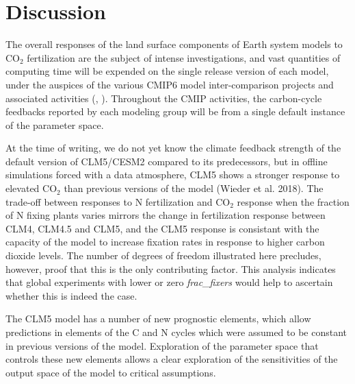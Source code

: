 \usepackage{}\documentclass[draft,linenumbers]{agujournal}
\begin{document}
\section{Discussion}

The overall responses of the land surface components of Earth system models to CO$_{2}$ fertilization are the subject of intense investigations, and vast quantities of computing time will be expended on the single release version of each model, under the auspices of the various CMIP6 model inter-comparison projects and associated activities (\cite{meehl2014}, \cite{eyring2016}). Throughout the CMIP activities, the carbon-cycle feedbacks reported by each modeling group will be from a single default instance of the parameter space.

At the time of writing, we do not yet know the climate feedback strength of the default version of CLM5/CESM2 compared to its predecessors, but in offline simulations forced with a data atmosphere, CLM5 shows a stronger response to elevated CO$_{2}$ than previous versions of the model (Wieder et al. 2018).  The trade-off between responses to N fertilization and CO$_{2}$ response when the fraction of N fixing plants varies mirrors the change in fertilization response between CLM4, CLM4.5 and CLM5, and the CLM5 response is consistant with the capacity of the model to increase fixation rates in response to higher carbon dioxide levels. The number of degrees of freedom illustrated here precludes, however, proof that this is the only contributing factor. This analysis indicates that global experiments with lower or zero \emph{frac\_fixers} would help to ascertain whether this is indeed the case.

The CLM5 model has a number of new prognostic elements, which allow predictions in elements of the C and N cycles which were assumed to be constant in previous versions of the model. Exploration of the parameter space that controls these new elements allows a clear exploration of the sensitivities of the output space of the model to critical assumptions. 
\end{document}
